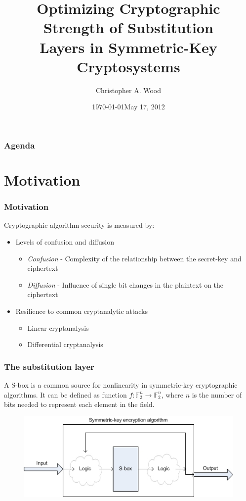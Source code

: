 \documentclass[handout]{beamer}
\title[Optimizing Substitution Layer Security]{Optimizing Cryptographic Strength of Substitution\\ Layers in Symmetric-Key Cryptosystems}
\institute[RIT]{}
\date{\today}
\author{Christopher A. Wood}
\date{May 17, 2012}
\newcommand{\field}[1]{\mathbb{#1}} %
\begin{document}

\begin{frame}
	\titlepage
\end{frame}

\begin{frame}
	\frametitle{Agenda}
	\tableofcontents
\end{frame}

\section{Motivation}
\begin{frame}
	\frametitle{Motivation}
	Cryptographic algorithm security is measured by:
	\begin{itemize}
		\item Levels of confusion and diffusion
		\begin{itemize}
			\item \emph{Confusion} - Complexity of the relationship between the secret-key and ciphertext
			\item \emph{Diffusion} - Influence of single bit changes in the plaintext on the ciphertext
		\end{itemize}
		\pause
		\item Resilience to common cryptanalytic attacks
		\begin{itemize}
			\item Linear cryptanalysis
			\item Differential cryptanalysis
		\end{itemize}
	\end{itemize}
\end{frame}


\begin{frame}
	\frametitle{The substitution layer}
	A S-box is a common source for nonlinearity in symmetric-key cryptographic algorithms. It can be defined as function $f : \field{F}_2^n \to \field{F}_2^n$, where $n$ is the number of bits needed to represent each element in the field.

\begin{figure}
\centering
\includegraphics[scale = 0.6]{images/sub_layer.jpg}
\end{figure}
\end{frame}
\end{document}
